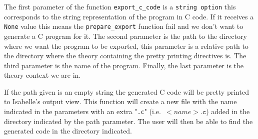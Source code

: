 The first parameter of the function \verb|export_c_code| is a \verb|string option| this corresponds to the string representation of the program in C code.
If it receives a \verb|None| value this means the \verb|prepare_export| function fail and we don't want to generate a C program for it.
The second parameter is the path to the directory where we want the program to be exported, this parameter is a relative path to the directory where the theory containing the pretty printing directives is.
The third parameter is the name of the program.
Finally, the last parameter is the theory context we are in.

If the path given is an empty string the generated C code will be pretty printed to Isabelle's output view.
This function will create a new file with the name indicated in the parameters with an extra "\verb|.c|" (i.e.\ $<name>\mathtt{.c}$) added in the directory indicated by the path parameter.
The user will then be able to find the generated code in the directory indicated.
